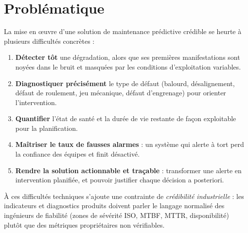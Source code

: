 \section{Problématique}
La mise en œuvre d'une solution de maintenance prédictive crédible se heurte à plusieurs
difficultés concrètes :
\begin{enumerate}[leftmargin=1.6em]
  \item \textbf{Détecter tôt} une dégradation, alors que ses premières manifestations sont
        noyées dans le bruit et masquées par les conditions d'exploitation variables.
  \item \textbf{Diagnostiquer précisément} le type de défaut (balourd, désalignement,
        défaut de roulement, jeu mécanique, défaut d'engrenage) pour orienter
        l'intervention.
  \item \textbf{Quantifier} l'état de santé et la durée de vie restante de façon
        exploitable pour la planification.
  \item \textbf{Maîtriser le taux de fausses alarmes} : un système qui alerte à tort
        perd la confiance des équipes et finit désactivé.
  \item \textbf{Rendre la solution actionnable et traçable} : transformer une alerte en
        intervention planifiée, et pouvoir justifier chaque décision a posteriori.
\end{enumerate}

À ces difficultés techniques s'ajoute une contrainte de \emph{crédibilité industrielle} :
les indicateurs et diagnostics produits doivent parler le langage normalisé des ingénieurs
de fiabilité (zones de sévérité ISO, MTBF, MTTR, disponibilité) plutôt que des métriques
propriétaires non vérifiables.

